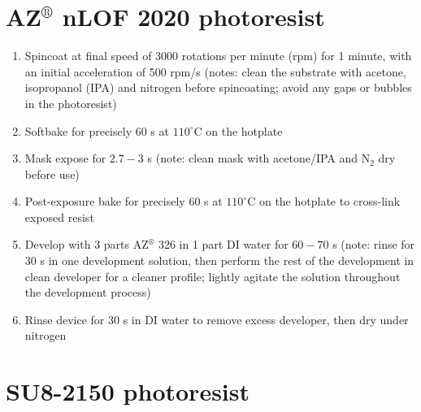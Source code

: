 \documentclass[
  a4paper,
]{scrbook}
\begin{document}
\hypertarget{azcircledr-nlof-2020-photoresist}{%
\section{\texorpdfstring{AZ\(^\circledR\) nLOF 2020
photoresist}{AZ\^{}\textbackslash circledR nLOF 2020 photoresist}}\label{azcircledr-nlof-2020-photoresist}}

\begin{enumerate}
\def\labelenumi{\arabic{enumi}.}
\item
  Spincoat at final speed of 3000 rotations per minute (rpm) for 1
  minute, with an initial acceleration of 500 rpm/s (notes: clean the
  substrate with acetone, isopropanol (IPA) and nitrogen before
  spincoating; avoid any gaps or bubbles in the photoresist)
\item
  Softbake for precisely 60 s at \(110^\circ\)C on the hotplate
\item
  Mask expose for \(2.7-3\) s (note: clean mask with acetone/IPA and
  N\(_2\) dry before use)
\item
  Post-exposure bake for precisely 60 s at \(110^\circ\)C on the
  hotplate to cross-link exposed resist
\item
  Develop with 3 parts AZ\(^\circledR\) 326 in 1 part DI water for
  \(60-70\) s (note: rinse for 30 s in one development solution, then
  perform the rest of the development in clean developer for a cleaner
  profile; lightly agitate the solution throughout the development
  process)
\item
  Rinse device for 30 s in DI water to remove excess developer, then dry
  under nitrogen
\end{enumerate}

\hypertarget{su8-2150-photoresist}{%
\section{SU8-2150 photoresist}\label{su8-2150-photoresist}}
\end{document}
